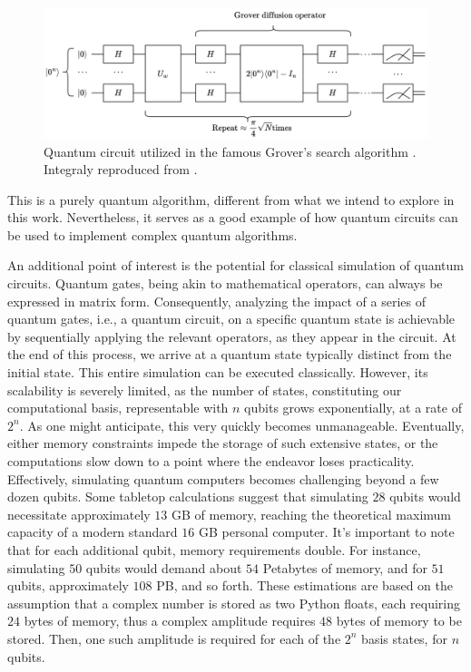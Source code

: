 \begin{figure}[H]
    \centering
    \includegraphics[width=\textwidth]{Figures/Diagrams/Grover_Circuit.png}
    \caption{Quantum circuit utilized in the famous Grover's search algorithm \cite{Grover}. Integraly reproduced from \cite{e26030216}.}
    \label{fig:QCircuit}
\end{figure}
This is a purely quantum algorithm, different from what we intend to explore in this work. Nevertheless, it serves as a good example of how quantum circuits can be used to implement complex quantum algorithms.

An additional point of interest is the potential for classical simulation of quantum circuits. Quantum gates, being akin to mathematical operators, can always be expressed in matrix form. Consequently, analyzing the impact of a series of quantum gates, i.e., a quantum circuit, on a specific quantum state is achievable by sequentially applying the relevant operators, as they appear in the circuit. At the end of this process, we arrive at a quantum state typically distinct from the initial state. This entire simulation can be executed classically. However, its scalability is severely limited, as the number of states, constituting our computational basis, representable with $n$ qubits grows exponentially, at a rate of $2^n$. As one might anticipate, this very quickly becomes unmanageable. Eventually, either memory constraints impede the storage of such extensive states, or the computations slow down to a point where the endeavor loses practicality. Effectively, simulating quantum computers becomes challenging beyond a few dozen qubits. Some tabletop calculations suggest that simulating $28$ qubits would necessitate approximately $13$ GB of memory, reaching the theoretical maximum capacity of a modern standard $16$ GB personal computer. It's important to note that for each additional qubit, memory requirements double. For instance, simulating $50$ qubits would demand about $54$ Petabytes of memory, and for $51$ qubits, approximately $108$ PB, and so forth. These estimations are based on the assumption that a complex number is stored as two Python floats, each requiring $24$ bytes of memory, thus a complex amplitude requires $48$ bytes of memory to be stored. Then, one such amplitude is required for each of the $2^{n}$ basis states, for $n$ qubits.


